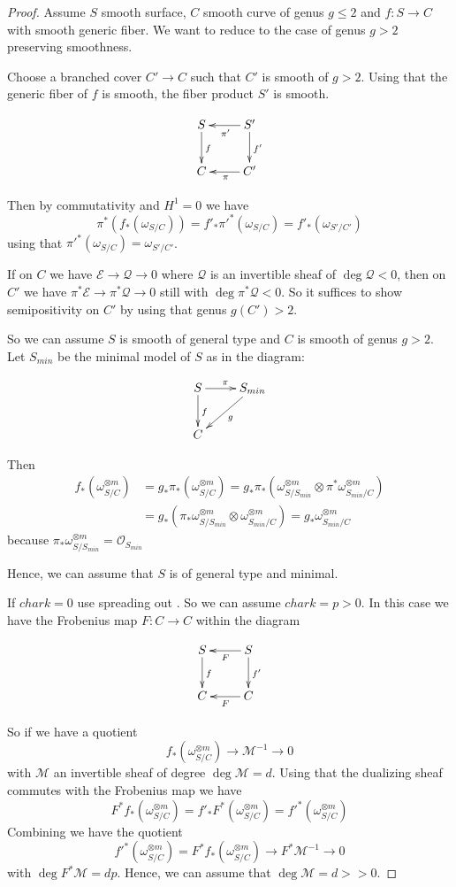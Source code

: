 \begin{proof}
Assume $S$ smooth surface, $C$ smooth curve of genus $g\leq 2$ and $f:S\to C$ with smooth generic fiber. We want to  reduce to the case of genus $g>2$ preserving smoothness.

Choose a branched cover $C'\to C$ such that $C'$ is smooth of $g>2$. Using that the generic fiber of $f$ is smooth, the fiber product $S'$ is smooth.

$$
\xymatrix{
S \ar[d]^f  &S' \ar[d]^{f'} \ar[l]^{\pi'} \\
C   &C' \ar[l]^{\pi}
}
$$

Then by commutativity and $H^1=0$ we have $$\pi^*(f_*(\omega_{S/C}))=f'_*\pi'^*(\omega_{S/C})=f'_*(\omega_{S'/C'})$$ using that $\pi'^*(\omega_{S/C})=\omega_{S'/C'}$.

If on $C$ we have $\mathcal{E}\to \mathcal{Q}\to 0$ where $\mathcal{Q}$ is an invertible sheaf of $\deg \mathcal{Q}<0$, then on $C'$ we have $\pi^*\mathcal{E}\to \pi^*\mathcal{Q}\to 0$ still with $\deg \pi^*\mathcal{Q}<0$. So it suffices to show semipositivity on $C'$ by using that genus $g(C')>2$.

So we can assume $S$ is smooth of general type and $C$ is smooth of genus $g>2$. Let $S_{min}$ be the minimal model of $S$ as in the diagram:

$$
\xymatrix{
S \ar[d]^f \ar[r]^{\pi} &S_{min} \ar[ld]^g\\
C
}
$$

Then
\begin{align*}
f_*(\omega^{\otimes m}_{S/C}) & =g_*\pi_*(\omega^{\otimes m}_{S/C})=g_*\pi_*(\omega^{\otimes m}_{S/S_{min}}\otimes \pi^*\omega^{\otimes m}_{S_{min}/C})\\ & =g_*(\pi_*\omega^{\otimes m}_{S/S_{min}}\otimes \omega^{\otimes m}_{S_{min}/C})=g_*\omega^{\otimes m}_{S_{min}/C}
\end{align*}
because $\pi_*\omega^{\otimes m}_{S/S_{min}}=\mathcal{O}_{S_{min}}$ 

Hence, we can assume that $S$ is of general type and minimal.

If $char k=0$ use spreading out . So we can assume $char k=p>0$. In this case we have the Frobenius map $F:C\to C$ within the diagram

$$
\xymatrix{
S \ar[d]^f  &S \ar[d]^{f'} \ar[l]^{F} \\
C   &C \ar[l]^{F}
}
$$

So if we have a quotient $$f_*(\omega^{\otimes m}_{S/C})\to \mathcal{M}^{-1}\to 0$$ with $\mathcal{M}$ an invertible sheaf of degree $\deg \mathcal{M}=d$. Using that the dualizing sheaf commutes with the Frobenius map we have $$F^*f_*(\omega^{\otimes m}_{S/C})=f'_*F^*(\omega^{\otimes m}_{S/C})=f'^*(\omega^{\otimes m}_{S/C})$$ Combining we have the quotient $$f'^*(\omega^{\otimes m}_{S/C})=F^*f_*(\omega^{\otimes m}_{S/C})\to F^*\mathcal{M}^{-1}\to 0$$ with $\deg F^*\mathcal{M}=dp$. Hence, we can assume that $\deg \mathcal{M}=d>>0$.


\end{proof}
